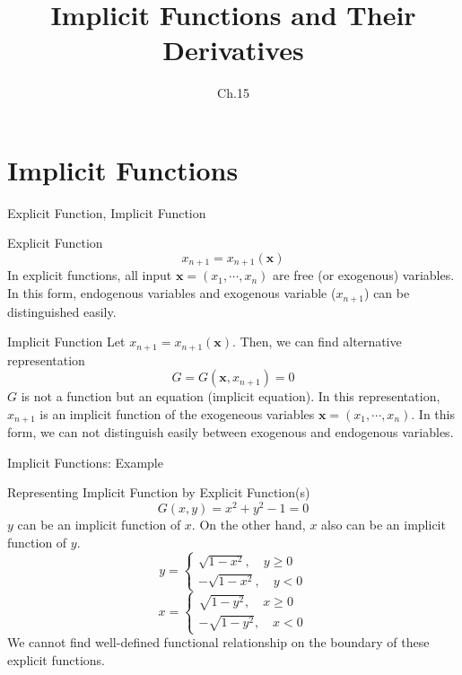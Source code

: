 \documentclass[a4paper,11pt]{article}
\author[조남운]{\mail}
\title{Implicit Functions and Their Derivatives}
\subtitle{Ch.15}
\newcommand{\bd}{\mathbf}
\begin{document}
	
\maketitle


\section{Implicit Functions} %
\label{sec:implicit_functions}
\begin{frame}[t]{Explicit Function, Implicit Function}
	\begin{block}
		{Explicit Function}
		\[
			x_{n+1}=x_{n+1}(\bd{x})
		\]
		In explicit functions, all input $\bd{x}=(x_1,\cdots,x_n)$ are free (or exogenous) variables. In this form, endogenous variables and exogenous variable ($x_{n+1}$) can be distinguished easily.
	\end{block}
	\begin{block}
		{Implicit Function}
		Let $x_{n+1}=x_{n+1}(\bd x)$. Then, we can find alternative representation 
		\[
			G=G(\bd{x},x_{n+1})=0
		\]
		$G$ is not a function but an equation (implicit equation). In this representation, $x_{n+1}$ is an implicit function of the exogeneous variables $\bd{x}=(x_1,\cdots,x_n)$. In this form, we can not distinguish easily between exogenous and endogenous variables. 
	\end{block}
\end{frame}

\begin{frame}[t]{Implicit Functions: Example}
	\begin{block}
		{Representing Implicit Function by Explicit Function(s)}
		\[
			G(x,y) = x^2 + y^2 - 1 = 0
		\]
		$y$ can be an implicit function of $x$. On the other hand, $x$ also can be an implicit function of $y$. 
		\[
			y=\begin{cases}
				\sqrt{1-x^2},\quad y\ge 0\\
				-\sqrt{1-x^2},\quad y< 0
			\end{cases}
		\]
		\[
			x=\begin{cases}
				\sqrt{1-y^2},\quad x\ge 0\\
				-\sqrt{1-y^2},\quad x< 0
			\end{cases}
		\]
		We cannot find well-defined functional relationship on the boundary of these explicit functions.
	\end{block}
\end{frame}
\end{document}
